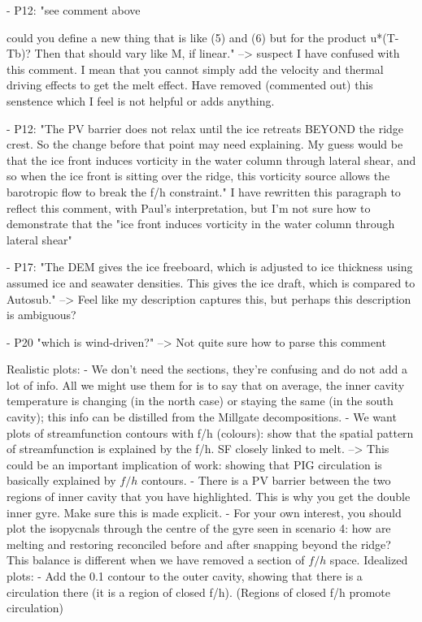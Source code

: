 - P12: "see comment above

could you define a new thing that is like (5) and (6) but for the product u*(T-Tb)?  Then that should vary like M, if linear." --> suspect I have confused with this comment. I mean that you cannot simply add the velocity and thermal driving effects to get the melt effect. Have removed (commented out) this senstence which I feel is not helpful or adds anything.

- P12: "The PV barrier does not relax until the ice retreats BEYOND the ridge crest. So the change before that point may need explaining.  My guess would be that the ice front induces vorticity in the water column through lateral shear, and so when the ice front is sitting over the ridge, this vorticity source allows the barotropic flow to break the f/h constraint."
I have rewritten this paragraph to reflect this comment, with Paul's interpretation, but I'm not sure how to demonstrate that the "ice front induces vorticity in the water column through lateral shear"

- P17: "The DEM gives the ice freeboard, which is adjusted to ice thickness using assumed ice and seawater densities.  This gives the ice draft, which is compared to Autosub." 
--> Feel like my description captures this, but perhaps this description is ambiguous?

- P20 "which is wind-driven?" 
--> Not quite sure how to parse this comment





Realistic plots:
    - We don't need the sections, they're confusing and do not add a lot of info. All we might use them for is to say that on average, the inner cavity temperature is changing (in the north case) or staying the same (in the south cavity); this info can be distilled from the Millgate decompositions.
    - We want plots of streamfunction contours with f/h (colours): show that the spatial pattern of streamfunction is explained by the f/h. SF closely linked to melt.
        --> This could be an important implication of work: showing that PIG circulation is basically explained by $f/h$ contours. 
    - There is a PV barrier between the two regions of inner cavity that you have highlighted. This is why you get the double inner gyre. Make sure this is made explicit. 
    - For your own interest, you should plot the isopycnals through the centre of the gyre seen in scenario 4: how are melting and restoring reconciled before and after snapping beyond the ridge? This balance is different when we have removed a section of $f/h$ space.
Idealized plots:
    - Add the 0.1 contour to the outer cavity, showing that there is a circulation there (it is a region of closed f/h). (Regions of closed f/h promote circulation)

